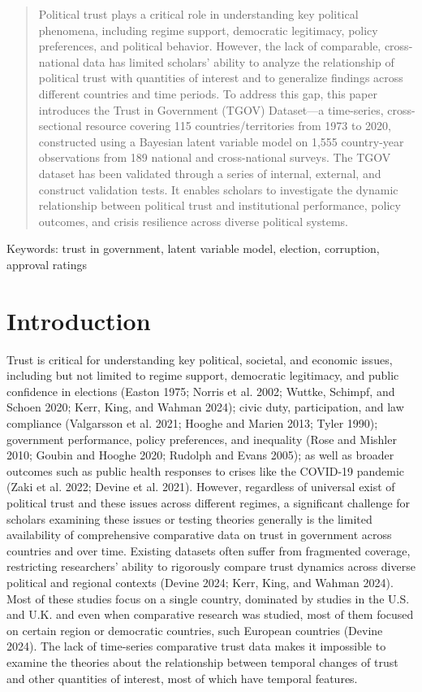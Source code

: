 \documentclass[
  12pt,
]{article}
\begin{document}
\begin{abstract}
Political trust plays a critical role in understanding key political phenomena, including regime support, democratic legitimacy, policy preferences, and political behavior. However, the lack of comparable, cross-national data has limited scholars' ability to analyze the relationship of political trust with quantities of interest and to generalize findings across different countries and time periods. To address this gap, this paper introduces the Trust in Government (TGOV) Dataset—a time-series, cross-sectional resource covering 115 countries/territories from 1973 to 2020, constructed using a Bayesian latent variable model on 1,555 country-year observations from 189 national and cross-national surveys. The TGOV dataset has been validated through a series of internal, external, and construct validation tests. It enables scholars to investigate the dynamic relationship between political trust and institutional performance, policy outcomes, and crisis resilience across diverse political systems.

\end{abstract}

Keywords: trust in government, latent variable model, election, corruption, approval ratings

\pagebreak


\section{Introduction}\label{introduction}

Trust is critical for understanding key political, societal, and economic issues, including but not limited to regime support, democratic legitimacy, and public confidence in elections (Easton 1975; Norris et al. 2002; Wuttke, Schimpf, and Schoen 2020; Kerr, King, and Wahman 2024); civic duty, participation, and law compliance (Valgarsson et al. 2021; Hooghe and Marien 2013; Tyler 1990); government performance, policy preferences, and inequality (Rose and Mishler 2010; Goubin and Hooghe 2020; Rudolph and Evans 2005); as well as broader outcomes such as public health responses to crises like the COVID-19 pandemic (Zaki et al. 2022; Devine et al. 2021).
However, regardless of universal exist of political trust and these issues across different regimes, a significant challenge for scholars examining these issues or testing theories generally is the limited availability of comprehensive comparative data on trust in government across countries and over time.
Existing datasets often suffer from fragmented coverage, restricting researchers' ability to rigorously compare trust dynamics across diverse political and regional contexts (Devine 2024; Kerr, King, and Wahman 2024).
Most of these studies focus on a single country, dominated by studies in the U.S. and U.K. and even when comparative research was studied, most of them focused on certain region or democratic countries, such European countries (Devine 2024).
The lack of time-series comparative trust data makes it impossible to examine the theories about the relationship between temporal changes of trust and other quantities of interest, most of which have temporal features.
\end{document}

